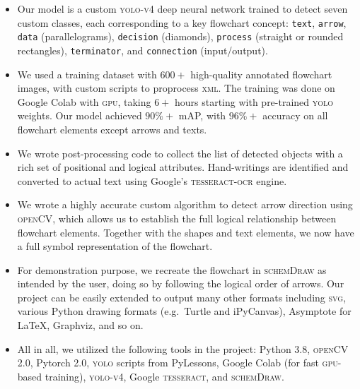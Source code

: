 \documentclass[10pt]{article}
\begin{document}
\begin{itemize}

\item Our model is a custom \textsc{yolo-v4} deep neural network
trained to detect seven custom classes, each corresponding to
a key flowchart concept: \texttt{text}, \texttt{arrow},
\texttt{data} (parallelograms), \texttt{decision} (diamonds), \texttt{process} (straight
or rounded rectangles), \texttt{terminator}, and \texttt{connection} (input/output).

\item We used a training dataset with $600+$ high-quality annotated flowchart
images, with custom scripts to proprocess \textsc{xml}.
The training was done on Google Colab with \textsc{gpu}, taking $6+$ hours
starting with pre-trained \textsc{yolo} weights.
Our model achieved $90\%+$ mAP, with $96\%+$ accuracy on
all flowchart elements except arrows and texts.

\item We wrote post-processing code to collect the list of detected objects with a
rich set of positional and logical attributes.
Hand-writings are identified and converted to actual text using
Google's \textsc{tesseract-ocr} engine.

\item We wrote a highly accurate custom algorithm to detect arrow direction
using \textsc{openCV}, which allows us to establish the full logical relationship
between flowchart elements. Together with the shapes and text elements, we now
have a full symbol representation of the flowchart.

\item For demonstration purpose,
we recreate the flowchart in \textsc{schemDraw} as intended by
the user, doing so by following the logical order of arrows.
Our project can be easily extended to
output many other formats including \textsc{svg}, various Python drawing
formats (e.g.~Turtle and iPyCanvas), Asymptote for \LaTeX, Graphviz, and so on.

\item All in all, we utilized the following tools in the project: Python 3.8,
\textsc{openCV} 2.0, Pytorch 2.0, \textsc{yolo} scripts from PyLessons,
Google Colab (for fast \textsc{gpu}-based training),
\textsc{yolo-v4}, Google \textsc{tesseract}, and
\textsc{schemDraw}.
\end{itemize}

\end{document}
